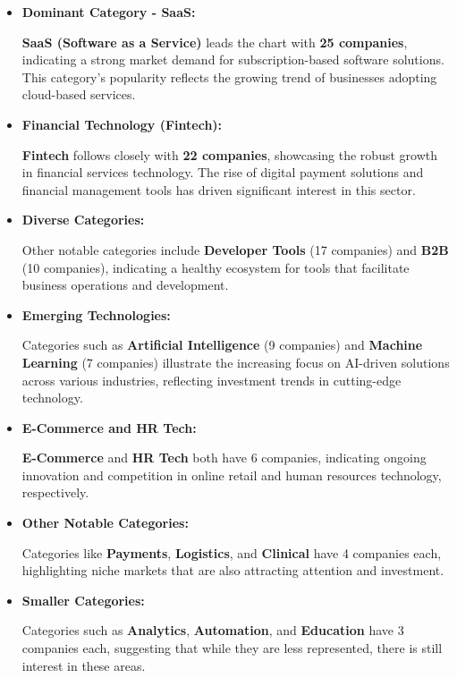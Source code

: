 \documentclass[a4paper,12pt]{article}
\begin{document}
\begin{itemize}
\item \textbf{Dominant Category - SaaS:}

\textbf{SaaS (Software as a Service)} leads the chart with \textbf{25 companies}, indicating a strong market demand for subscription-based software solutions. This category's popularity reflects the growing trend of businesses adopting cloud-based services.

\item \textbf{Financial Technology (Fintech):}

\textbf{Fintech} follows closely with \textbf{22 companies}, showcasing the robust growth in financial services technology. The rise of digital payment solutions and financial management tools has driven significant interest in this sector.

\item \textbf{Diverse Categories:}

Other notable categories include \textbf{Developer Tools} (17 companies) and \textbf{B2B} (10 companies), indicating a healthy ecosystem for tools that facilitate business operations and development.

\item \textbf{Emerging Technologies:}

Categories such as \textbf{Artificial Intelligence} (9 companies) and \textbf{Machine Learning} (7 companies) illustrate the increasing focus on AI-driven solutions across various industries, reflecting investment trends in cutting-edge technology.

\item \textbf{E-Commerce and HR Tech:}

\textbf{E-Commerce} and \textbf{HR Tech} both have 6 companies, indicating ongoing innovation and competition in online retail and human resources technology, respectively.

\item \textbf{Other Notable Categories:}

Categories like \textbf{Payments}, \textbf{Logistics}, and \textbf{Clinical} have 4 companies each, highlighting niche markets that are also attracting attention and investment.

\item \textbf{Smaller Categories:}

Categories such as \textbf{Analytics}, \textbf{Automation}, and \textbf{Education} have 3 companies each, suggesting that while they are less represented, there is still interest in these areas.
\end{itemize}
\end{document}
